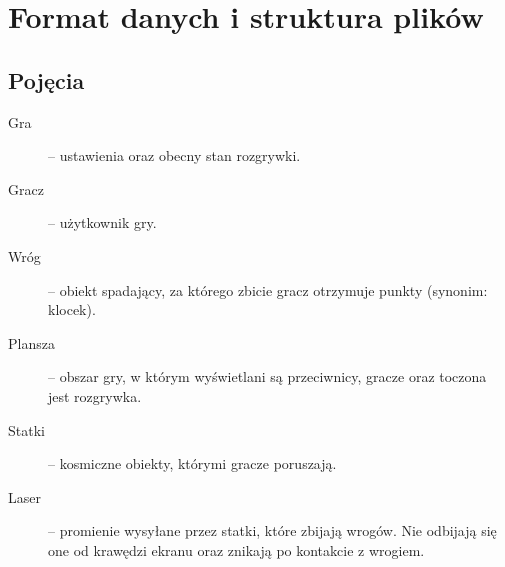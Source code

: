 \documentclass[a4paper]{article}
\begin{document}
\section{Format danych i struktura plików}

\subsection{Pojęcia}
\begin{description}
    \item[Gra]-- ustawienia oraz obecny stan rozgrywki.
    \item[Gracz]-- użytkownik gry.
    \item[Wróg]-- obiekt spadający, za którego zbicie gracz otrzymuje punkty (synonim: klocek). 
    \item[Plansza]-- obszar gry, w którym wyświetlani są przeciwnicy, gracze oraz toczona jest rozgrywka.
    \item[Statki]-- kosmiczne obiekty, którymi gracze poruszają.
    \item[Laser]-- promienie wysyłane przez statki, które zbijają wrogów. Nie odbijają się one od krawędzi ekranu oraz znikają po kontakcie z wrogiem.
\end{description}
\end{document}

